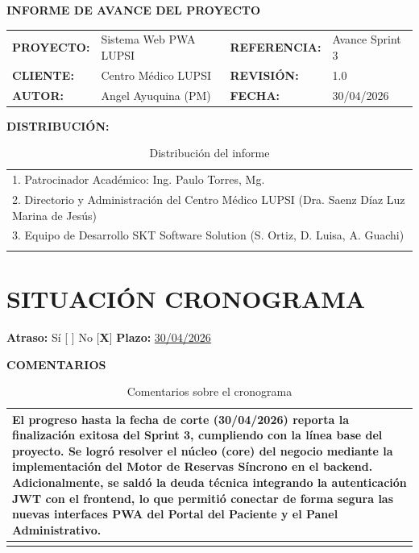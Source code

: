\documentclass[11pt]{article}
\begin{document}
\begin{center}
    {\Huge \textbf{INFORME DE AVANCE DEL PROYECTO}}
\end{center}

\vspace{0.5cm}

\begin{tabular}{p{2.5cm}p{5.5cm}p{3cm}p{4cm}}
    \textbf{PROYECTO:} & Sistema Web PWA LUPSI & \textbf{REFERENCIA:}  & Avance Sprint 3 \\
    \textbf{CLIENTE:} & Centro Médico LUPSI & \textbf{REVISIÓN:} & 1.0 \\
    \textbf{AUTOR:} & Angel Ayuquina (PM) & \textbf{FECHA:} & 30/04/2026 \\
\end{tabular}

\vspace{0.5cm}

\textbf{DISTRIBUCIÓN:}
\begin{longtable}{|p{}|}
    \hline
    1. Patrocinador Académico: Ing. Paulo Torres, Mg. \\
    2. Directorio y Administración del Centro Médico LUPSI (Dra. Saenz Díaz Luz Marina de Jesús) \\
    3. Equipo de Desarrollo SKT Software Solution (S. Ortiz, D. Luisa, A. Guachi) \\
    \hline
    \caption{Distribución del informe}
\end{longtable}

\section*{SITUACIÓN CRONOGRAMA}

\textbf{Atraso:} \hspace{0.5cm} Sí [ ] \hspace{1cm} No [\textbf{X}] \hspace{1cm} \textbf{Plazo:} \underline{30/04/2026}

\textbf{COMENTARIOS}

\begin{longtable}{|p{}|}
    \hline
    El progreso hasta la fecha de corte (30/04/2026) reporta la finalización exitosa del Sprint 3, cumpliendo con la línea base del proyecto. Se logró resolver el núcleo (core) del negocio mediante la implementación del Motor de Reservas Síncrono en el backend. Adicionalmente, se saldó la deuda técnica integrando la autenticación JWT con el frontend, lo que permitió conectar de forma segura las nuevas interfaces PWA del Portal del Paciente y el Panel Administrativo. \\
    \hline
    \caption{Comentarios sobre el cronograma}
\end{longtable}
\end{document}
